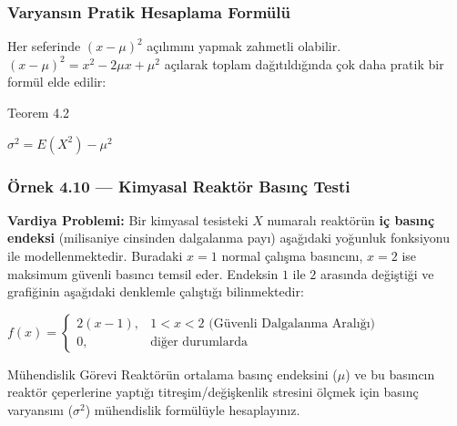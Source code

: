 ﻿\documentclass[light]{lutbeamer}
\begin{document}
\begin{frame}[fragile]
  \frametitle[Teorem 4.2]{Varyansın Pratik Hesaplama Formülü}
  Her seferinde $(x - \mu)^2$ açılımını yapmak zahmetli olabilir. $(x-\mu)^2 = x^2 - 2\mu x + \mu^2$ açılarak toplam dağıtıldığında çok daha pratik bir formül elde edilir:

  \begin{center}
    \begin{minipage}{0.8\textwidth}
      \begin{block}{Teorem 4.2}
        \begin{center}
          $\sigma^2 = E(X^2) - \mu^2$
        \end{center}
      \end{block}
    \end{minipage}
  \end{center}

\end{frame}

\begin{frame}[fragile]
  \frametitle{Örnek 4.10 --- Kimyasal Reaktör Basınç Testi}

  \justifying{}
  \small \textbf{Vardiya Problemi:} Bir kimyasal tesisteki $X$ numaralı reaktörün \textbf{iç basınç endeksi} (milisaniye cinsinden dalgalanma payı) aşağıdaki yoğunluk fonksiyonu ile modellenmektedir. Buradaki $x = 1$ normal çalışma basıncını, $x = 2$ ise maksimum güvenli basıncı temsil eder. Endeksin $1$ ile $2$ arasında değiştiği ve grafiğinin aşağıdaki denklemle çalıştığı bilinmektedir:

  \vspace{0.5em}
  \begin{center}
    $f(x) = \begin{cases} 2(x-1), & 1 < x < 2 \text{ (Güvenli Dalgalanma Aralığı)} \\[2pt] 0, & \text{diğer durumlarda} \end{cases}$
  \end{center}

  \vspace{1em}
  \begin{exampleblock}{Mühendislik Görevi}
    \footnotesize Reaktörün ortalama basınç endeksini ($\mu$) ve bu basıncın reaktör çeperlerine yaptığı titreşim/değişkenlik stresini ölçmek için basınç varyansını ($\sigma^2$) mühendislik formülüyle hesaplayınız.
  \end{exampleblock}
\end{frame}
\end{document}
